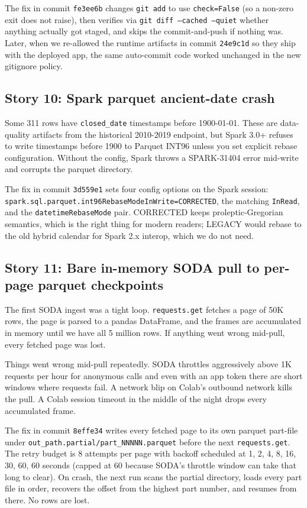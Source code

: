 \documentclass[11pt,letterpaper]{book}
\begin{document}
The fix in commit \texttt{fe3ee6b} changes \texttt{git add} to use \texttt{check=False} (so a non-zero exit does not raise), then verifies via \texttt{git diff --cached --quiet} whether anything actually got staged, and skips the commit-and-push if nothing was. Later, when we re-allowed the runtime artifacts in commit \texttt{24e9c1d} so they ship with the deployed app, the same auto-commit code worked unchanged in the new gitignore policy.

\subsection*{Story 10: Spark parquet ancient-date crash}

Some 311 rows have \texttt{closed\_date} timestamps before 1900-01-01. These are data-quality artifacts from the historical 2010-2019 endpoint, but Spark 3.0+ refuses to write timestamps before 1900 to Parquet INT96 unless you set explicit rebase configuration. Without the config, Spark throws a SPARK-31404 error mid-write and corrupts the parquet directory.

The fix in commit \texttt{3d559e1} sets four config options on the Spark session: \texttt{spark.sql.parquet.int96RebaseModeInWrite=CORRECTED}, the matching \texttt{InRead}, and the \texttt{datetimeRebaseMode} pair. CORRECTED keeps proleptic-Gregorian semantics, which is the right thing for modern readers; LEGACY would rebase to the old hybrid calendar for Spark 2.x interop, which we do not need.

\subsection*{Story 11: Bare in-memory SODA pull to per-page parquet checkpoints}

The first SODA ingest was a tight loop. \texttt{requests.get} fetches a page of 50K rows, the page is parsed to a pandas DataFrame, and the frames are accumulated in memory until we have all 5 million rows. If anything went wrong mid-pull, every fetched page was lost.

Things went wrong mid-pull repeatedly. SODA throttles aggressively above 1K requests per hour for anonymous calls and even with an app token there are short windows where requests fail. A network blip on Colab's outbound network kills the pull. A Colab session timeout in the middle of the night drops every accumulated frame.

The fix in commit \texttt{8effe34} writes every fetched page to its own parquet part-file under \texttt{out\_path.partial/part\_NNNNN.parquet} before the next \texttt{requests.get}. The retry budget is 8 attempts per page with backoff scheduled at 1, 2, 4, 8, 16, 30, 60, 60 seconds (capped at 60 because SODA's throttle window can take that long to clear). On crash, the next run scans the partial directory, loads every part file in order, recovers the offset from the highest part number, and resumes from there. No rows are lost.
\end{document}
